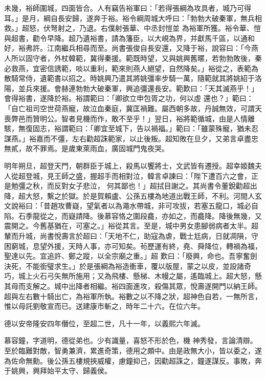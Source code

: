 \begin{pinyinscope}
 未幾，裕師圍城，四面皆合。人有竊告裕軍曰：「若得張綱為攻具者，城乃可得耳。」是月，綱自長安歸，遂奔于裕。裕令綱周城大呼曰：「勃勃大破秦軍，無兵相救。」超怒，伏弩射之，乃退。右僕射張華、中丞封愷並
 為裕軍所獲。裕令華、愷與超書，勸令早降。超乃遺裕書，請為籓臣，以大峴為界，并獻馬千區，以通和好，裕弗許。江南繼兵相尋而至。尚書張俊自長安還，又降于裕，說容曰：「今燕人所以固守者，外杖韓範，冀得秦援。範既時望，又與姚興舊暱，若勃勃敗後，秦必救燕，宜密信誘範，啖以重利，範來則燕人絕望，自然降矣。」裕從之，表範為散騎常侍，遺範書以招之。時姚興乃遣其將姚彊率步騎一萬，隨範就其將姚紹于洛陽，並兵來援。會赫連勃勃大破秦軍，興追彊還長安。範歎曰：「天其滅燕乎！」會得裕書，遂降於裕。裕謂範曰：「卿欲立申包胥之功，何以虛
 還也？」範曰：「自亡祖司空世荷燕寵，故泣血秦庭，冀匡禍難。屬西朝多故，丹誠無效，可謂天喪弊邑而贊明公。智者見機而作，敢不至乎！」翌日，裕將範循城，由是人情離駭，無復固志，裕謂範曰：「卿宜至城下，告以禍福。」範曰：「雖蒙殊寵，猶未忍謀燕。」裕嘉而不彊，左右勸超誅範家，以止後叛。超知敗在旦夕，又弟言卓盡忠無貳，故不罪焉。是歲東萊雨血，廣固城門鬼夜哭。



 明年朔旦，超登天門，朝群臣于城上，殺馬以饗將士，文武皆有遷授。超幸姬魏夫人從超登城，見王師之盛，握超手而相對泣，韓言卓諫曰：「陛下遭百六之會，正是勉彊之秋，而反對女子悲泣，
 何其鄙也！」超拭目謝之。其尚書令董銳勸超出降，超大怒，繫之於獄。於是賀賴盧、公孫五樓為地道出戰王師，不利。河間人玄文說裕曰：「昔趙攻曹嶷，望氣者以為澠水帶城，非可攻拔，若塞五龍口，城必自陷。石季龍從之，而嶷請降。後慕容恪之圍段龕，亦如之，而龕降。降後無幾，又震開之。今舊基猶在，可塞之。」裕從其言。至是，城中男女患腳弱病者太半。超輦而升城，尚書悅壽言於超曰：「天地不仁，助寇為虐，戰士尪病，日就凋隕，守困窮城，息望外援，天時人事，亦可知矣。茍歷運有終，堯、舜降位，轉禍為福，聖達以先。宜追許、鄭之蹤，以全宗廟之重。」超
 歎曰：「廢興，命也。吾寧奮劍決死，不能銜璧求生。」於是張綱為裕造衝車，覆以版屋，蒙之以皮，並設諸奇巧，城上火石弓矢無所施用；又為飛樓、懸梯、木幔之屬，遙臨城上。超大怒，懸其母而支解之。城中出降者相繼。裕四面進攻，殺傷其眾，悅壽遂開門以納王師。超與左右數十騎出亡，為裕軍所執。裕數之以不降之狀，超神色自若，一無所言，惟以母託劉敬宣而已。送建康市斬之，時年二十六。在位六年。



 德以安帝隆安四年僭位，至超二世，凡十一年，以義熙六年滅。



 慕容鐘，字道明，德從弟也。少有識量，喜怒不形於色，機
 神秀發，言論清辯。至於臨難對敵，智勇兼濟，累進奇策，德用之頗中。由是政無大小，皆以委之，遂為佐命無勳。後公孫五樓規挾威權，慮鐘抑己，因勸超誅之，鐘遂謀反。事敗，奔于姚興，興拜始平太守、歸義侯。




\end{pinyinscope}
